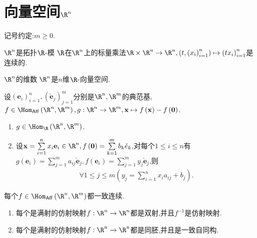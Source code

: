 \section{向量空间\texorpdfstring{$\R^{n}$}{Rn}}

记号约定:$m\geq 0$.

\begin{proposition}{$\R^{n}$是拓扑$\R$-模}{}
	$\R$在$\R^{n}$上的标量乘法$\R\times\R^{n}\to\R^{n},\left(t,\left(x_{i}\right)_{i=1}^{n}\right)\mapsto\left(tx_{i}\right)_{i=1}^{n}$是连续的.
\end{proposition}

\begin{proposition}{$\R^{n}$的维数}{}
	$\R^{n}$是$n$维$\R$-向量空间.
\end{proposition}

\begin{proposition}{}{}
	设$\left(\mathbf{e}_{i}\right)_{i=1}^{n},\left(\check{\mathbf{e}}_{j}\right)_{j=1}^{m}$分别是$\R^{n},\R^{m}$的典范基,$f\in\Hom_{\mathsf{Aff}}\left(\R^{n},\R^{m}\right),g:\R^{n}\to\R^{m},\mathbf{x}\mapsto f\left(\mathbf{x}\right)-f\left(\mathbf{0}\right)$.
	\begin{enumerate}
		\item $g\in\Hom_{\R}\left(\R^{n},\R^{m}\right)$.
		\item 设$\mathbf{x}=\sum\limits_{i=1}^{n}x_{i}\mathbf{e}_{i}\in\R^{n},f\left(\mathbf{0}\right)=\sum\limits_{k=1}^{m}b_{k}\check{e}_{k}$,对每个$1\leq i\leq n$有$g\left(\mathbf{e}_{i}\right)=\sum\limits_{j=1}^{m}a_{ij}\check{\mathbf{e}}_{j},f\left(\mathbf{e}_{i}\right)=\sum\limits_{j=1}^{m}y_{j}\check{\mathbf{e}}_{j}$,则
		\begin{align*}
			\forall 1\leq j\leq m\left(y_{j}=\sum\limits_{i=1}^{n}x_{i}a_{ij}+b_{j}\right).
		\end{align*}
	\end{enumerate}
\end{proposition}

\begin{proposition}{}{}
	每个$f\in\Hom_{\mathsf{Aff}}\left(\R^{n},\R^{m}\right)$都一致连续.
\end{proposition}

\begin{proposition}{}{}
	\begin{enumerate}
		\item 每个是满射的仿射映射$f:\R^{n}\to\R^{n}$都是双射,并且$f^{-1}$是仿射映射.
		\item 每个是满射的仿射映射$f:\R^{n}\to\R^{n}$都是同胚,并且是一致自同构.
	\end{enumerate}
\end{proposition}

